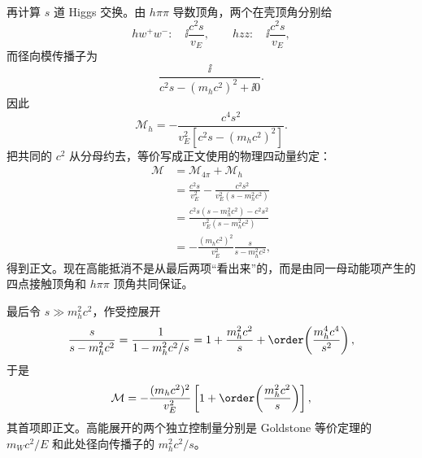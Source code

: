 \begin{derivation}[纵向矢量散射中的高能增长与抵消]
再计算 $s$ 道 Higgs 交换。由 $h\pi\pi$ 导数顶角，两个在壳顶角分别给
\begin{equation*}
 h w^+w^-:\quad
 \ii\frac{c^2s}{v_E},
 \qquad
 hzz:\quad
 \ii\frac{c^2s}{v_E},
\end{equation*}
而径向模传播子为
\begin{equation*}
 \frac{\ii}{c^2s-(m_hc^2)^2+\ii0}.
\end{equation*}
因此
\begin{equation*}
 \mathcal M_h
 =-\frac{c^4s^2}{v_E^2[c^2s-(m_hc^2)^2]}.
\end{equation*}
把共同的 $c^2$ 从分母约去，等价写成正文使用的物理四动量约定：
\begin{align*}
 \mathcal M
 &=\mathcal M_{4\pi}+\mathcal M_h\\
 &=\frac{c^2s}{v_E^2}
 -\frac{c^2s^2}{v_E^2(s-m_h^2c^2)}\\
 &=\frac{c^2s(s-m_h^2c^2)-c^2s^2}
 {v_E^2(s-m_h^2c^2)}\\
 &=-\frac{(m_hc^2)^2}{v_E^2}
 \frac{s}{s-m_h^2c^2},
\end{align*}
得到正文。现在高能抵消不是从最后两项“看出来”的，而是由同一母动能项产生的四点接触顶角和 $h\pi\pi$ 顶角共同保证。

最后令 $s\gg m_h^2c^2$，作受控展开
\begin{equation*}
 \frac{s}{s-m_h^2c^2}
 =\frac1{1-m_h^2c^2/s}
 =1+\frac{m_h^2c^2}{s}
 +\order\!\left(\frac{m_h^4c^4}{s^2}\right),
\end{equation*}
于是
\begin{equation*}
 \mathcal M
 =-\frac{(m_hc^2)^2}{v_E^2}
 \left[1+\order\!\left(\frac{m_h^2c^2}{s}\right)\right],
\end{equation*}
其首项即正文。高能展开的两个独立控制量分别是 Goldstone 等价定理的 $m_Wc^2/E$ 和此处径向传播子的 $m_h^2c^2/s$。
\end{derivation}

